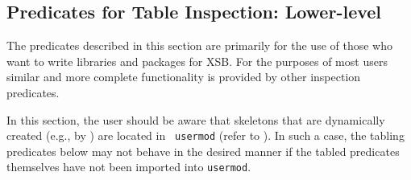 \begin{description}


\subsection{Predicates for Table Inspection: Lower-level} \label{sec:table-inspection-low}

The predicates described in this section are primarily for the use of
those who want to write libraries and packages for XSB.  For the
purposes of most users similar and more complete functionality is
provided by other inspection predicates.

In this section, the user should be aware that skeletons that are
dynamically created (e.g., by ) are located in {\tt
  usermod} (refer to ).  In such a case, the tabling
predicates below may not behave in the desired manner if the tabled
predicates themselves have not been imported into {\tt usermod}.


\end{description}
